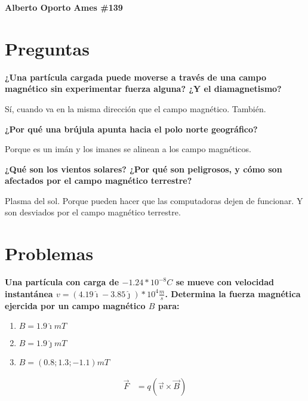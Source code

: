 \documentclass[10pt, twoside]{article}
\begin{document}
\thispagestyle{fancy}

\textbf{Alberto Oporto Ames \#139}

\section*{Preguntas}%

\textbf{¿Una partícula cargada puede moverse a través de una campo magnético
sin experimentar fuerza alguna?
¿Y el diamagnetismo?}

Sí, cuando va en la misma dirección que el campo magnético.
También.

\textbf{¿Por qué una brújula apunta hacia el polo norte geográfico?}

Porque es un imán y los imanes se alinean a los campo magnéticos.

\textbf{¿Qué son los vientos solares?
¿Por qué son peligrosos, y cómo son afectados por el campo magnético
terrestre?}

Plasma del sol.
Porque pueden hacer que las computadoras dejen de funcionar.
Y son desviados por el campo magnético terrestre.

\section*{Problemas}%
\textbf{
	\boldmath
	Una partícula con carga de $-1.24*10^{-8}C$ se mueve con velocidad instantánea
	$\allowbreak v=(4.19\hat{\imath}-3.85\hat{\jmath})*10^4 \frac{m}{s}$.
	Determina la fuerza magnética ejercida por un campo magnético $B$ para:
}
\begin{enumerate}[label=\alph*.]
	\item $B=1.9\hat{\imath}mT$
	\item $B=1.9\hat{\jmath}mT$
	\item $B=(0.8;1.3;-1.1)mT$
\end{enumerate}

\begin{align*}
	\vec{F} &= q(\vec{v}\times\vec{B})
\end{align*}
\end{document}
